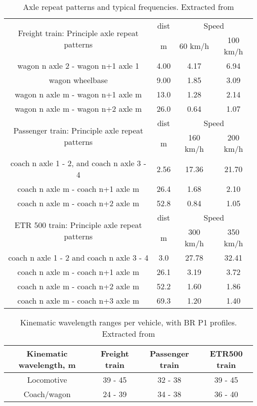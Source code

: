 \begin{appendices}
\begin{table}[h]
    \centering
    \begin{tabular}{c|c|c|c}
    \hline
    \multirow{2}{*}{Freight train: Principle axle repeat patterns} & dist & \multicolumn{2}{c}{Speed} \\
    & m & 60 km/h & 100 km/h \\
    \hline
    wagon n axle 2 - wagon n+1 axle 1 & 4.00 & 4.17 & 6.94 \\
    wagon wheelbase & 9.00 & 1.85 & 3.09 \\
    wagon n axle m - wagon n+1 axle m & 13.0 & 1.28 & 2.14 \\
    wagon n axle m - wagon n+2 axle m & 26.0 & 0.64 & 1.07 \\
    \hline
    \multirow{2}{*}{Passenger train: Principle axle repeat patterns} & dist & \multicolumn{2}{c}{Speed} \\
    & m & 160 km/h & 200 km/h \\
    \hline
    coach n axle 1 - 2, and coach n axle 3 - 4 & 2.56 & 17.36 & 21.70 \\
    coach n axle m - coach n+1 axle m & 26.4 & 1.68 & 2.10 \\
    coach n axle m - coach n+2 axle m & 52.8 & 0.84 & 1.05 \\
    \hline
    \multirow{2}{*}{ETR 500 train: Principle axle repeat patterns} & dist & \multicolumn{2}{c}{Speed} \\
    & m & 300 km/h & 350 km/h \\
    \hline
    coach n axle 1 - 2 and coach n axle 3 - 4 & 3.0 & 27.78 & 32.41 \\
    coach n axle m - coach n+1 axle m & 26.1 & 3.19 & 3.72 \\
    coach n axle m - coach n+2 axle m & 52.2 & 1.60 & 1.86 \\
    coach n axle m - coach n+3 axle m & 69.3 & 1.20 & 1.40 \\
    \hline
    \end{tabular}
    \caption{Axle repeat patterns and typical frequencies. Extracted from \citet[Appendix C]{d181dt329}}
    \label{tab:329axlerepeat}
\end{table}

\begin{table}[h]
    \centering
    \begin{tabular}{c|c|c|c}
    \hline
    Kinematic wavelength, m & Freight train & Passenger train & ETR500 train \\
    \hline
    Locomotive & 39 - 45 & 32 - 38 & 39 - 45 \\
    Coach/wagon & 24 - 39 & 34 - 38 & 36 - 40 \\
    \hline
    \end{tabular}
    \caption{Kinematic wavelength ranges per vehicle, with BR P1 profiles. Extracted from \citet[Appendix C]{d181dt329}}
    \label{tab:329kinematicwavelength}
\end{table}


\end{appendices}
